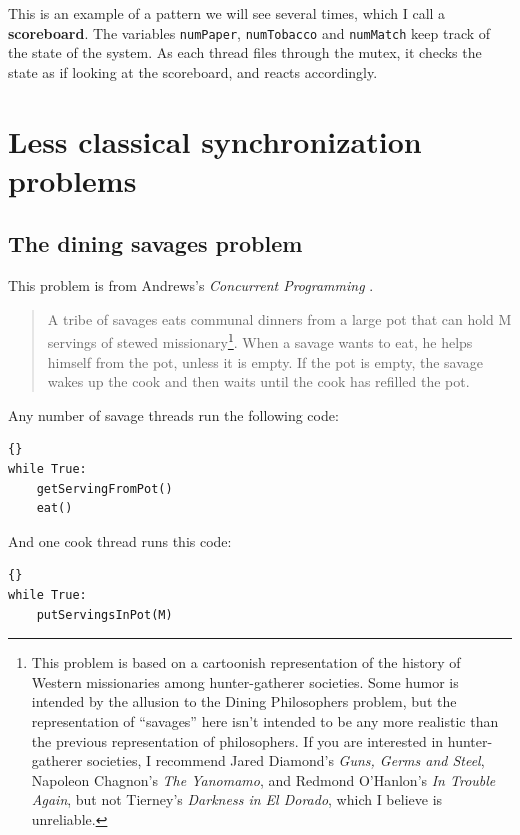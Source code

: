 \documentclass{book}
\begin{document}
This is an example of a pattern we will see several times, which
I call a {\bf scoreboard}.  The variables {\tt numPaper}, {\tt numTobacco}
and {\tt numMatch} keep track of the state of the system.  As each
thread files through the mutex, it checks the state as if looking
at the scoreboard, and reacts accordingly.



\chapter{Less classical synchronization problems}
\label{next}


\section{The dining savages problem}

This problem is from Andrews's
{\em Concurrent Programming} \cite{andrews}.

\begin {quotation}
A tribe of savages eats communal dinners from a large pot that can
hold M servings of stewed missionary\footnote{This problem is based on
a cartoonish representation of the history of Western missionaries
among hunter-gatherer societies.  Some humor is intended by the
allusion to the Dining Philosophers problem, but the representation of
``savages'' here isn't intended to be any more realistic than the
previous representation of philosophers.  If you are interested in
hunter-gatherer societies, I recommend Jared Diamond's {\em Guns,
Germs and Steel}, Napoleon Chagnon's {\em The Yanomamo}, and Redmond
O'Hanlon's {\em In Trouble Again}, but not Tierney's {\em Darkness in
El Dorado}, which I believe is unreliable.}.  When a savage wants to
eat, he helps himself from the pot, unless it is empty.  If the pot is
empty, the savage wakes up the cook and then waits until the cook has
refilled the pot.
\end{quotation}

Any number of savage threads run the following code:

\begin{lstlisting}[title={Unsynchronized savage code}]{}
while True:
    getServingFromPot()
    eat()
\end{lstlisting}

And one cook thread runs this code:

\pagebreak
\begin{lstlisting}[title={Unsynchronized cook code}]{}
while True:
    putServingsInPot(M)
\end{lstlisting}
\end{document}
